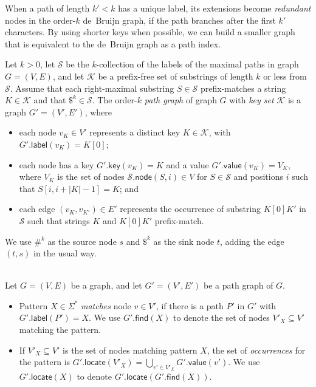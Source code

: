 \documentclass[twoside,leqno,twocolumn]{article}
\newcommand{\abs}[1]{\ensuremath{\lvert #1 \rvert}}
\newcommand{\find}{\ensuremath{\mathsf{find}}}
\newcommand{\locate}{\ensuremath{\mathsf{locate}}}
\newcommand{\glabel}{\ensuremath{\mathsf{label}}}
\newcommand{\gkey}{\ensuremath{\mathsf{key}}}
\newcommand{\gvalue}{\ensuremath{\mathsf{value}}}
\newcommand{\gnode}{\ensuremath{\mathsf{node}}}
\newcommand{\kcollection}[1]{$#1$\nobreakdash-collection}
\newcommand{\orderk}[1]{order\nobreakdash-$#1$}
\begin{document}
When a path of length $k' < k$ has a unique label, its extensions become \emph{redundant} nodes in the \orderk{k} de~Bruijn graph, if the path branches after the first $k'$ characters. By using shorter keys when possible, we can build a smaller graph that is equivalent to the de~Bruijn graph as a path index.

\begin{Definition}
Let $k > 0$, let $\mathcal{S}$ be the \kcollection{k} of the labels of the maximal paths in graph $G = (V, E)$, and let $\mathcal{K}$ be a prefix-free set of substrings of length $k$ or less from $\mathcal{S}$. Assume that each right-maximal substring $S \in \mathcal{S}$ prefix-matches a string $K \in \mathcal{K}$ and that $\$^{k} \in \mathcal{S}$. The \orderk{k} \emph{path graph} of graph $G$ with \emph{key set} $\mathcal{K}$ is a graph $G' = (V', E')$, where
\begin{itemize}
\item each node $v_{K} \in V'$ represents a distinct key $K \in \mathcal{K}$, with $G'.\glabel(v_{K}) = K[0]$;
\item each node has a key $G'.\gkey(v_{K}) = K$ and a value $G'.\gvalue(v_{K}) = V_{K}$, where $V_{K}$ is the set of nodes $\mathcal{S}.\gnode(S, i) \in V$ for $S \in \mathcal{S}$ and positions $i$ such that $S[i, i+\abs{K}-1] = K$; and
\item each edge $(v_{K}, v_{K'}) \in E'$ represents the occurrence of substring $K[0] K'$ in $\mathcal{S}$ such that strings $K$ and $K[0] K'$ prefix-match.
\end{itemize}
We use $\#^{k}$ as the source node $s$ and $\$^{k}$ as the sink node $t$, adding the edge $(t, s)$ in the usual way.
\end{Definition}

\begin{Definition} ~\\
Let $G = (V, E)$ be a graph, and let $G' = (V', E')$ be a path graph of $G$.
\begin{itemize}
\item Pattern $X \in \Sigma^{\ast}$ \emph{matches} node $v \in V'$, if there is a path $P'$ in $G'$ with $G'.\glabel(P') = X$. We use $G'.\find(X)$ to denote the set of nodes $V'_{X} \subseteq V'$ matching the pattern.
\item If $V'_{X} \subseteq V'$ is the set of nodes matching pattern $X$, the set of \emph{occurrences} for the pattern is $G'.\locate(V'_{X}) = \bigcup_{v' \in V'_{X}} G'.\gvalue(v')$. We use $G'.\locate(X)$ to denote $G'.\locate(G'.\find(X))$.
\end{itemize}
\end{Definition}
\end{document}
